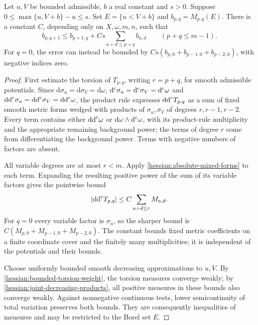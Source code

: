 \begin{lemma}\label{hessian:mixed-torsion-comparison}
Let $u,V$ be bounded admissible, $b$ a real constant and $s>0$.
Suppose $0\leq\max\{u,V+b\}-u\leq s$. Set
$E=\{u<V+b\}$ and $b_{p,q}=M_{p,q}(E)$.
There is a constant $C$, depending only on $X,\omega,m,n$, such that
\[
 b_{p,q+1}\leq b_{p+1,q}
              +Cs\sum_{a+d\leq p+q}b_{a,d}
                   \qquad(p+q\leq m-1).
\]
For $q=0$, the error can instead be bounded by
$Cs(b_{p,0}+b_{p-1,0}+b_{p-2,0})$, with negative indices zero.
\end{lemma}
\begin{proof}
First estimate the torsion of $T_{p,q}$, writing $r=p+q$, for
smooth admissible potentials. Since
$\mathrm d\sigma_u=\mathrm d\sigma_V=\mathrm d\omega$,
$\mathrm d^{\mathrm c}\sigma_u=\mathrm d^{\mathrm c}\sigma_V=\mathrm d^{\mathrm c}\omega$ and
$\mathrm{dd}^{\mathrm{c}}\sigma_u=\mathrm{dd}^{\mathrm{c}}\sigma_V=\mathrm{dd}^{\mathrm{c}}\omega$, the product rule
expresses $\mathrm{dd}^{\mathrm{c}} T_{p,q}$ as a sum of fixed smooth metric forms
wedged with products of $\sigma_u,\sigma_V$ of degrees $r,r-1,r-2$.
Every term contains either $\mathrm{dd}^{\mathrm{c}}\omega$ or
$\mathrm d\omega\wedge\mathrm d^{\mathrm c}\omega$, with its product-rule
multiplicity and the appropriate remaining background power; the
terms of degree $r$ come from differentiating the background power.
Terms with negative numbers of factors are absent.

All variable degrees are at most $r<m$.
Apply \cref{hessian:absolute-mixed-forms} to each term. Expanding
the resulting positive power of the sum of its variable factors
gives the pointwise bound
\[
 |\mathrm{dd}^{\mathrm{c}} T_{p,q}|\leq C\sum_{a+d\leq r}M_{a,d}.
\]
For $q=0$ every variable factor is $\sigma_u$, so the sharper
bound is $C(M_{p,0}+M_{p-1,0}+M_{p-2,0})$.
The constant bounds fixed metric coefficients on a finite coordinate
cover and the finitely many multiplicities; it is independent of
the potentials and their bounds.

Choose uniformly bounded smooth decreasing approximations to $u,V$.
By \cref{hessian:bounded-torsion-weight}, the torsion measures
converge weakly; by \cref{hessian:joint-decreasing-products},
all positive measures in these bounds also converge weakly.
Against nonnegative continuous tests, lower semicontinuity of
total variation preserves both bounds. They are consequently
inequalities of measures and may be restricted to the Borel set $E$.


\end{proof}
